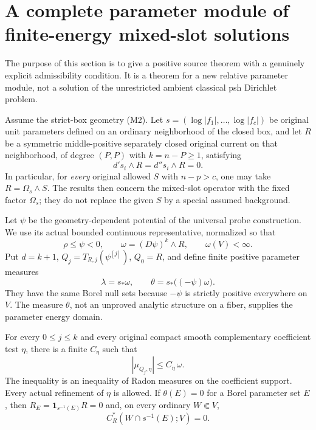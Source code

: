 \section{A complete parameter module of finite-energy mixed-slot solutions}
\label{sec:r12-parameter-energy-Dirichlet}

The purpose of this section is to give a positive source theorem
with a genuinely explicit admissibility condition. It is a theorem
for a new relative parameter module, not a solution of the
unrestricted ambient classical psh Dirichlet problem.

Assume the strict-box geometry (M2). Let $s=(\log|f_1|,\ldots,
\log|f_c|)$ be original unit parameters defined on an ordinary
neighborhood of the closed box, and let $R$ be a symmetric
middle-positive separately closed original current on that
neighborhood, of degree $(P,P)$ with $k=n-P\geq1$, satisfying
\[
                         d's_i\wedge R=d''s_i\wedge R=0.
 \tag{PD1}
\]
In particular, for \emph{every} original allowed $S$ with
$n-p>c$, one may take $R=\Omega_s\wedge S$. The results then
concern the mixed-slot operator with the fixed factor $\Omega_s$;
they do not replace the given $S$ by a special assumed background.

Let $\psi$ be the geometry-dependent potential of the universal
probe construction. We use its actual bounded continuous
representative, normalized so that
\[
 \rho\leq\psi<0,\qquad
 \omega=(D\psi)^k\wedge R,\qquad \omega(V)<\infty.
 \tag{PD2}
\]
Put $d=k+1$, $Q_j=T_{R,j}(\psi^{[j]})$, $Q_0=R$, and define
finite positive parameter measures
\[
                      \lambda=s_*\omega,\qquad
                      \theta=s_*\bigl((-\psi)\omega\bigr).
 \tag{PD3}
\]
They have the same Borel null sets because $-\psi$ is strictly
positive everywhere on $V$. The measure $\theta$, not an
unproved analytic structure on a fiber, supplies the parameter
energy domain.

\begin{lemma}
\label{lem:r12-parameter-tail-domination}
For every $0\leq j\leq k$ and every original compact smooth
complementary coefficient test $\eta$, there is a finite
$C_\eta$ such that
\[
                         |\mu_{Q_j,\eta}|\leq C_\eta\,\omega.
 \tag{PD4}
\]
The inequality is an inequality of Radon measures on the
coefficient support. Every actual refinement of $\eta$ is
allowed. If $\theta(E)=0$ for a Borel parameter set $E$, then
$R_E=\mathbf1_{s^{-1}(E)}R=0$ and, on every ordinary
$W\Subset V$,
\[
                     C_R^*(W\cap s^{-1}(E);V)=0.
 \tag{PD5}
\]
\end{lemma}

